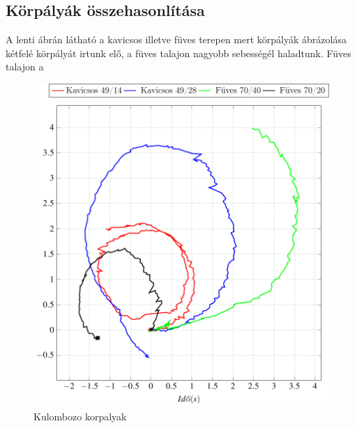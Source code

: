 



\subsection{Körpályák összehasonlítása}

A lenti ábrán látható a kavicsos illetve füves terepen mert körpályák ábrázolása kétfelé körpályát irtunk elő, a füves talajon nagyobb sebességél haladtunk. Füves talajon a 

\begin{figure}[H]
  \includegraphics{tikz/KorpalyakKavicsos.pdf}
  \caption{Kulombozo korpalyak}
  \label{fig:KorpalyakKavicsos}  
\end{figure}